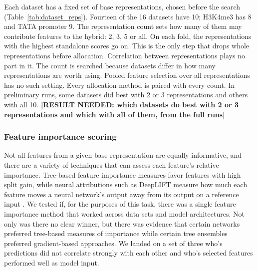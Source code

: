 Each dataset has a fixed set of base representations, chosen before the search (Table~\ref{tab:dataset_reps}). Fourteen of the 16 datasets have 10; H3K4me3 has 8 and TATA promoter 9. The representation count sets how many of them may contribute features to the hybrid: 2, 3, 5 or all. On each fold, the representations with the highest standalone scores go on. This is the only step that drops whole representations before allocation. Correlation between representations plays no part in it. The count is searched because datasets differ in how many representations are worth using. Pooled feature selection over all representations has no such setting. Every allocation method is paired with every count. In preliminary runs, some datasets did best with 2 or 3 representations and others with all 10. \textbf{[RESULT NEEDED: which datasets do best with 2 or 3 representations and which with all of them, from the full runs]}

\subsubsection{Feature importance scoring}


Not all features from a given base representation are equally informative, and there are a variety of techniques that can assess each feature's relative importance. Tree-based feature importance measures favor features with high split gain, while neural attributions such as DeepLIFT measure how much each feature moves a neural network's output away from its output on a reference input \citep{Strobl2007, Ancona2018}.
We tested if, for the purposes of this task, there was a single feature importance method that worked across data sets and model architectures. Not only was there no clear winner, but there was evidence that certain networks preferred tree-based measures of importance while certain tree ensembles preferred gradient-based approaches. We landed on a set of three who's predictions did not correlate strongly with each other and who's selected features performed well as model input.

